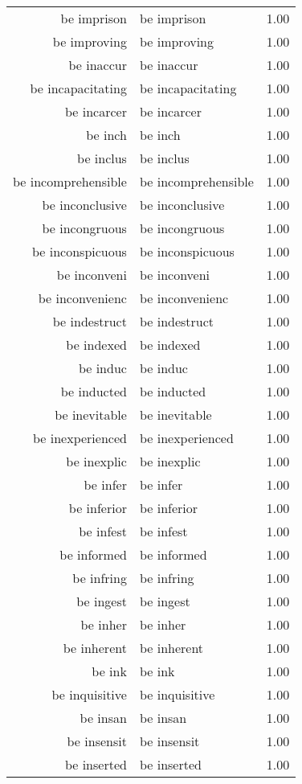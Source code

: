 \begin{table}[ht]
\begin{tabular}{rlr}
  be imprison & be imprison & 1.00 \\ 
  be improving & be improving & 1.00 \\ 
  be inaccur & be inaccur & 1.00 \\ 
  be incapacitating & be incapacitating & 1.00 \\ 
  be incarcer & be incarcer & 1.00 \\ 
  be inch & be inch & 1.00 \\ 
  be inclus & be inclus & 1.00 \\ 
  be incomprehensible & be incomprehensible & 1.00 \\ 
  be inconclusive & be inconclusive & 1.00 \\ 
  be incongruous & be incongruous & 1.00 \\ 
  be inconspicuous & be inconspicuous & 1.00 \\ 
  be inconveni & be inconveni & 1.00 \\ 
  be inconvenienc & be inconvenienc & 1.00 \\ 
  be indestruct & be indestruct & 1.00 \\ 
  be indexed & be indexed & 1.00 \\ 
  be induc & be induc & 1.00 \\ 
  be inducted & be inducted & 1.00 \\ 
  be inevitable & be inevitable & 1.00 \\ 
  be inexperienced & be inexperienced & 1.00 \\ 
  be inexplic & be inexplic & 1.00 \\ 
  be infer & be infer & 1.00 \\ 
  be inferior & be inferior & 1.00 \\ 
  be infest & be infest & 1.00 \\ 
  be informed & be informed & 1.00 \\ 
  be infring & be infring & 1.00 \\ 
  be ingest & be ingest & 1.00 \\ 
  be inher & be inher & 1.00 \\ 
  be inherent & be inherent & 1.00 \\ 
  be ink & be ink & 1.00 \\ 
  be inquisitive & be inquisitive & 1.00 \\ 
  be insan & be insan & 1.00 \\ 
  be insensit & be insensit & 1.00 \\ 
  be inserted & be inserted & 1.00 \\ 

\end{tabular}
\end{table}

